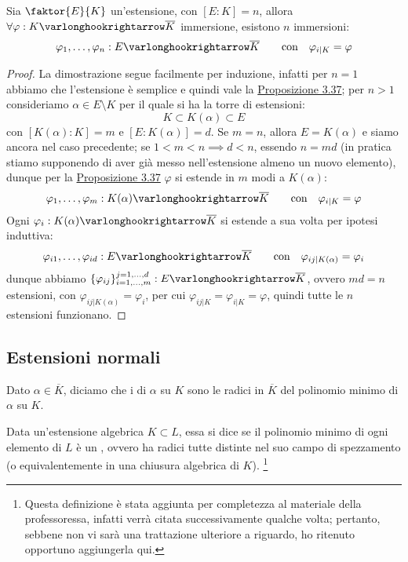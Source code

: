\documentclass[11pt]{scrartcl}
\begin{document}
\begin{corollary}
    \label{3.39}
    Sia $\faktor{E}{K}$ un'estensione, con $[E:K] = n$, allora $\forall \varphi : K \varlonghookrightarrow \overline K$ immersione, esistono $n$ immersioni:
    \[ \varphi_1,\ldots,\varphi_n : E \varlonghookrightarrow \overline K \qquad \text{con} \quad \varphi_{i|K} = \varphi
        \]
\end{corollary}

\begin{proof}
    La dimostrazione segue facilmente per induzione, infatti per $n = 1$ abbiamo che l'estensione è semplice e quindi vale la \hyperref[3.37]{Proposizione 3.37}; per $n>1$ consideriamo
    $\alpha \in E \setminus K$ per il quale si ha la torre di estensioni:
    \[ K \subset K(\alpha) \subset E
        \]
    con $[K(\alpha) : K] = m$ e $[E : K(\alpha)] = d$. Se $m = n$, allora $E = K(\alpha)$ e siamo ancora nel caso precedente; se $1 < m < n \implies d < n$,
    essendo $n = md$ (in pratica stiamo supponendo di aver già messo nell'estensione almeno un nuovo elemento), dunque per la \hyperref[3.37]{Proposizione 3.37} $\varphi$ si estende in $m$ modi a $K(\alpha)$:
    \[ \varphi_1,\ldots,\varphi_m : K(\alpha) \varlonghookrightarrow \overline K \qquad \text{con} \quad \varphi_{i|K} = \varphi
        \]
    Ogni $\varphi_i : K(\alpha) \varlonghookrightarrow \overline K$ si estende a sua volta per ipotesi induttiva:
    \[ \varphi_{i1},\ldots,\varphi_{id} : E \varlonghookrightarrow \overline K \qquad \text{con} \quad \varphi_{ij|K(\alpha)} = \varphi_i
        \]
    dunque abbiamo $\{\varphi_{ij}\}_{i = 1,\ldots,m}^{j = 1,\ldots,d} : E \varlonghookrightarrow \overline K$, ovvero $md = n$ estensioni, con $\varphi_{ij | K(\alpha)} = \varphi_i $, per cui $\varphi_{ij|K} = \varphi_{i | K} = \varphi$, quindi tutte le $n$ estensioni funzionano.
\end{proof}

\newpage
\subsection{Estensioni normali}

\begin{definition}
    Dato $\alpha \in \overline K$, diciamo che i  di $\alpha$ su $K$ sono le radici in $\overline K$ del polinomio minimo di $\alpha$ su $K$. 
\end{definition}

\begin{definition}
    Data un'estensione algebrica $K \subset L$, essa si dice  se il polinomio minimo di ogni elemento di $L$ è un
    , ovvero ha radici tutte distinte nel suo campo di spezzamento (o equivalentemente in una chiusura algebrica di $K$).
    \footnote{Questa definizione è stata aggiunta per completezza al materiale della professoressa, infatti verrà citata successivamente qualche volta; 
    pertanto, sebbene non vi sarà una trattazione ulteriore a riguardo, ho ritenuto opportuno aggiungerla qui.}
\end{definition}
\end{document}
